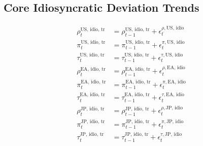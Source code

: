 \documentclass{article}
\begin{document}
\subsection*{Core Idiosyncratic Deviation Trends}
\begin{align}
    \rho^{\text{US, idio, tr}}_t &= \rho^{\text{US, idio, tr}}_{t-1} + \epsilon^{\rho, \text{US, idio}}_t \\
    \pi^{\text{US, idio, tr}}_t &= \pi^{\text{US, idio, tr}}_{t-1} + \epsilon^{\pi, \text{US, idio}}_t \\
    \tau^{\text{US, idio, tr}}_t &= \tau^{\text{US, idio, tr}}_{t-1} + \epsilon^{\tau, \text{US, idio}}_t \\
    \rho^{\text{EA, idio, tr}}_t &= \rho^{\text{EA, idio, tr}}_{t-1} + \epsilon^{\rho, \text{EA, idio}}_t \\
    \pi^{\text{EA, idio, tr}}_t &= \pi^{\text{EA, idio, tr}}_{t-1} + \epsilon^{\pi, \text{EA, idio}}_t \\
    \tau^{\text{EA, idio, tr}}_t &= \tau^{\text{EA, idio, tr}}_{t-1} + \epsilon^{\tau, \text{EA, idio}}_t \\
    \rho^{\text{JP, idio, tr}}_t &= \rho^{\text{JP, idio, tr}}_{t-1} + \epsilon^{\rho, \text{JP, idio}}_t \\
    \pi^{\text{JP, idio, tr}}_t &= \pi^{\text{JP, idio, tr}}_{t-1} + \epsilon^{\pi, \text{JP, idio}}_t \\
    \tau^{\text{JP, idio, tr}}_t &= \tau^{\text{JP, idio, tr}}_{t-1} + \epsilon^{\tau, \text{JP, idio}}_t
\end{align}
\end{document}
